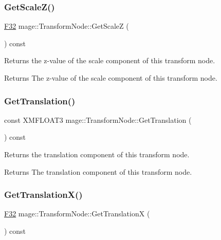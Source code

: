 \subsubsection{\texorpdfstring{Get\+Scale\+Z()}{GetScaleZ()}}
{\footnotesize\ttfamily \hyperlink{namespacemage_aa97e833b45f06d60a0a9c4fc22ae02c0}{F32} mage\+::\+Transform\+Node\+::\+Get\+ScaleZ (\begin{DoxyParamCaption}{ }\end{DoxyParamCaption}) const\hspace{0.3cm}{\ttfamily [noexcept]}}

Returns the z-\/value of the scale component of this transform node.

\begin{DoxyReturn}{Returns}
The z-\/value of the scale component of this transform node. 
\end{DoxyReturn}
\hypertarget{structmage_1_1_transform_node_a98da5fb59f03d37a615a9846e5f5e926}{}\label{structmage_1_1_transform_node_a98da5fb59f03d37a615a9846e5f5e926} 
\subsubsection{\texorpdfstring{Get\+Translation()}{GetTranslation()}}
{\footnotesize\ttfamily const X\+M\+F\+L\+O\+A\+T3 mage\+::\+Transform\+Node\+::\+Get\+Translation (\begin{DoxyParamCaption}{ }\end{DoxyParamCaption}) const\hspace{0.3cm}{\ttfamily [noexcept]}}

Returns the translation component of this transform node.

\begin{DoxyReturn}{Returns}
The translation component of this transform node. 
\end{DoxyReturn}
\hypertarget{structmage_1_1_transform_node_a62d6ef7ab4fb3b9e550990655655ed5b}{}\label{structmage_1_1_transform_node_a62d6ef7ab4fb3b9e550990655655ed5b} 
\subsubsection{\texorpdfstring{Get\+Translation\+X()}{GetTranslationX()}}
{\footnotesize\ttfamily \hyperlink{namespacemage_aa97e833b45f06d60a0a9c4fc22ae02c0}{F32} mage\+::\+Transform\+Node\+::\+Get\+TranslationX (\begin{DoxyParamCaption}{ }\end{DoxyParamCaption}) const\hspace{0.3cm}{\ttfamily [noexcept]}}

